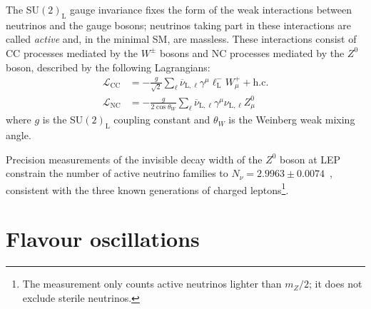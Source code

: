 The SU$(2)_\text{L}$ gauge invariance fixes the form of the weak interactions between neutrinos and the gauge bosons; neutrinos taking part in these interactions are called \textit{active} and, in the minimal \ac{SM}, are massless. These interactions consist of \ac{CC} processes mediated by the $W^\pm$ bosons and \ac{NC} processes mediated by the $Z^0$ boson, described by the following Lagrangians:
\begin{equation}
    \label{eq:SM-neutrino-lagrangian}
    \begin{aligned}
        \mathcal{L}_\text{CC} &= - \frac{g}{\sqrt{2}} \sum_{\ell} \overline{\nu}_{\text{L},\ell} \gamma^\mu \ell_\text{L}^- W_\mu^+ + \text{h.c.} \\
        \mathcal{L}_\text{NC} &= - \frac{g}{2 \cos \theta_W} \sum_{\ell} \overline{\nu}_{\text{L},\ell} \gamma^\mu \nu_{\text{L},\ell} Z_\mu^0
    \end{aligned}
\end{equation}
where $g$ is the SU$(2)_\text{L}$ coupling constant and $\theta_W$ is the Weinberg weak mixing angle. 

Precision measurements of the invisible decay width of the $Z^0$ boson at LEP constrain the number of active neutrino families to $N_\nu = 2.9963 \pm 0.0074$~\cite{JanotJadach2020}, consistent with the three known generations of charged leptons\footnote{The measurement only counts active neutrinos lighter than $m_Z/2$; it does not exclude sterile neutrinos.}.

\section{Flavour oscillations}

